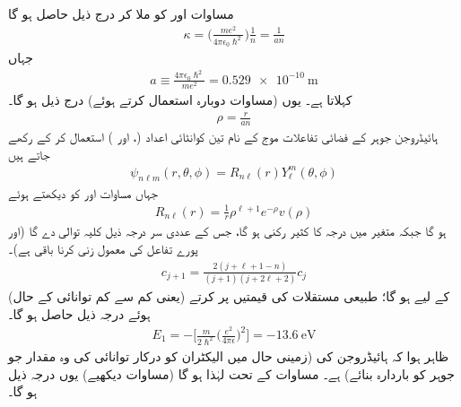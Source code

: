  مساوات   اور  کو ملا کر درج ذیل حاصل ہو گا
\begin{align}
\kappa =\big(\frac{me^{2}}{4\pi\epsilon_{0}\hslash^{2}}\big)\frac{1}{n}=\frac{1}{an} 
\end{align}
جہاں
\begin{align}\label{مساوات_تین_ابعادی_رداس_بوہر}
a\equiv\frac{4\pi\epsilon_{0}\hslash^{2}}{me^{2}}=\SI{0.529e-10}{\meter}
\end{align}
 کہلاتا ہے۔ یوں (مساوات  دوبارہ استعمال کرتے ہوئے) درج ذیل ہو گا۔
\begin{align}
\rho=\frac{r}{an} 
\end{align}
ہائیڈروجن جوہر کے فضائی تفاعلات  موج کے نام تین کوانٹائی اعداد (،  اور ) استعمال کر کے رکھے جاتے ہیں 
 \begin{align}
\psi_{n\ell m}(r,\theta,\phi)=R_{n\ell}(r)Y_{\ell}^{m}(\theta,\phi) 
\end{align}
 جہاں مساوات  اور  کو دیکھتے ہوئے
 \begin{align}
R_{n\ell}(r)=\frac{1}{r}\rho^{\ell+1}e^{-\rho}v(\rho) 
\end{align} 
 ہو گا  جبکہ  متغیر  میں درجہ   کا کثیر رکنی ہو گا، جس کے عددی سر  درجہ ذیل کلیہ توالی دے گا (اور پورے تفاعل کی  معمول زنی کرنا   باقی ہے)۔
 \begin{align}\label{مساوات_ابعادی_کلیہ_توالی_کولمب_مخفیہ}
c_{j+1}=\frac{2(j+\ell+1-n)}{(j+1)(j+2\ell+2)}c_{j} 
\end{align}
 (یعنی کم سے کم توانائی کے حال)  کے لیے 
  ہو گا؛ طبیعی مستقلات کی  قیمتیں پر کرتے ہوئے درجہ ذیل حاصل ہو گا۔
 \begin{align}\label{مساوات_تین_ابعاد_ہائیڈروجن_بندشی_توانائی}
E_{1}=-\big[\frac{m}{2\hslash^{2}}\big(\frac{e^{2}}{4\pi\epsilon}\big)^{2}\big]=\SI{-13.6}{\electronvolt}
\end{align}
 ظاہر ہوا کہ  ہائیڈروجن کی  (زمینی حال میں الیکٹران کو درکار  توانائی کی وہ مقدار جو جوہر کو باردارہ بنائے)   ہے۔ مساوات  کے تحت   لہٰذا   ہو گا (مساوات  دیکھیے) یوں درجہ ذیل ہو گا۔
